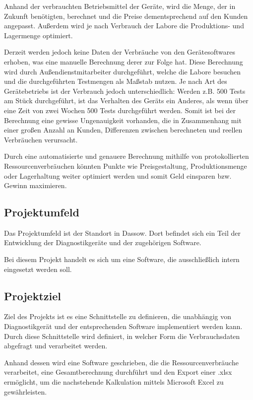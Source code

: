 Anhand der verbrauchten Betriebsmittel der Geräte, wird die Menge, der in Zukunft benötigten, berechnet und die Preise dementsprechend auf den Kunden angepasst. Außerdem wird je nach Verbrauch der Labore die Produktions- und Lagermenge optimiert.

Derzeit werden jedoch keine Daten der Verbräuche von den Gerätesoftwares erhoben, was eine manuelle Berechnung derer zur Folge hat. Diese Berechnung wird durch Außendienstmitarbeiter durchgeführt, welche die Labore besuchen und die durchgeführten Testmengen als Maßstab nutzen. Je nach Art des Gerätebetriebs ist der Verbrauch jedoch unterschiedlich: Werden z.B. 500 Tests am Stück durchgeführt, ist das Verhalten des Geräts ein Anderes, als wenn über eine Zeit von zwei Wochen 500 Tests durchgeführt werden. Somit ist bei der Berechnung eine gewisse Ungenauigkeit vorhanden, die in Zusammenhang mit einer großen Anzahl an Kunden, Differenzen zwischen berechneten und reellen Verbräuchen verursacht. 

Durch eine automatisierte und genauere Berechnung mithilfe von protokollierten Ressourcenverbräuchen könnten Punkte wie Preisgestaltung, Produktionsmenge oder Lagerhaltung weiter optimiert werden und somit Geld einsparen bzw. Gewinn maximieren.

\subsection{Projektumfeld}
\label{sec:Projektumfeld}
Das Projektumfeld ist der {\betriebNameKzf} Standort in Dassow. Dort befindet sich ein Teil der Entwicklung der Diagnostikgeräte und der zugehörigen Software. 

Bei diesem Projekt handelt es sich um eine Software, die ausschließlich intern eingesetzt werden soll.

\subsection{Projektziel}
\label{sec:Projektziel}
Ziel des Projekts ist es eine Schnittstelle zu definieren, die unabhängig von Diagnostikgerät und der entsprechenden Software implementiert werden kann. Durch diese Schnittstelle wird definiert, in welcher Form die Verbrauchsdaten abgefragt und verarbeitet werden.

Anhand dessen wird eine Software geschrieben, die die Ressourcenverbräuche verarbeitet, eine Gesamtberechnung durchführt und den Export einer \glqq .xlsx\grqq \xspace ermöglicht, um die nachstehende Kalkulation mittels Microsoft Excel zu gewährleisten.

